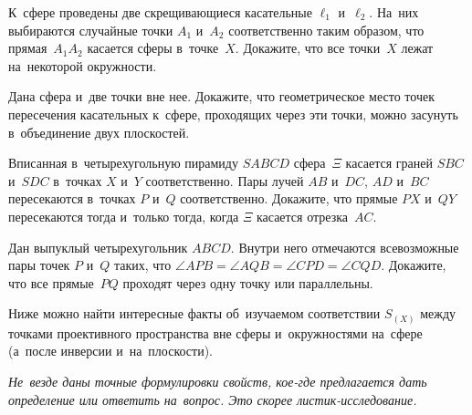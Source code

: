 \begin{problems}

\item
К~сфере проведены две скрещивающиеся касательные $\ell_1$ и~$\ell_2$.
На~них выбираются случайные точки $A_1$ и~$A_2$ соответственно таким образом,
что прямая~$A_{1}A_{2}$ касается сферы в~точке~$X$.
Докажите, что все точки~$X$ лежат на~некоторой окружности.

\item
Дана сфера и~две точки вне нее.
Докажите, что геометрическое место точек пересечения касательных к~сфере,
проходящих через эти точки, можно засунуть в~объединение двух плоскостей.

\item
Вписанная в~четырехугольную пирамиду $SABCD$ сфера~$\Xi$ касается
граней $SBC$ и~$SDC$ в~точках $X$ и~$Y$ соответственно.
Пары лучей $AB$ и~$DC$, $AD$ и~$BC$ пересекаются в~точках $P$ и~$Q$
соответственно.
Докажите, что прямые $PX$ и~$QY$ пересекаются тогда и~только тогда, когда $\Xi$
касается отрезка~$AC$.

\item
Дан выпуклый четырехугольник $ABCD$.
Внутри него отмечаются всевозможные пары точек $P$ и~$Q$ таких, что
$\angle APB = \angle AQB = \angle CPD  = \angle CQD$.
Докажите, что все прямые~$PQ$ проходят через одну точку или параллельны.

\end{problems}

Ниже можно найти интересные факты об~изучаемом соответствии $S_{(X)}$ между
точками проективного пространства вне сферы и~окружностями на~сфере (а~после
инверсии и~на~плоскости).
\par
\emph{Не~везде даны точные формулировки свойств, кое-где предлагается дать
определение или ответить на~вопрос.
Это скорее листик-исследование.}


